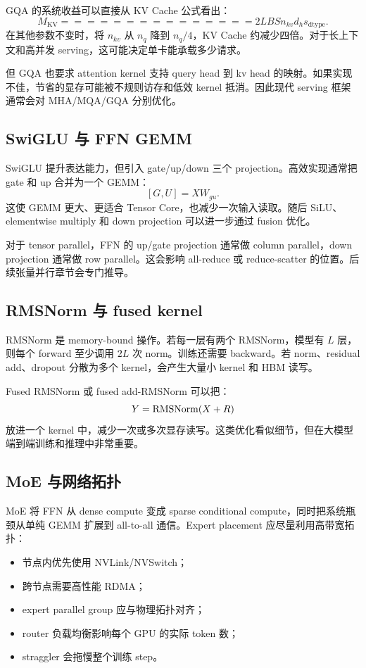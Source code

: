 GQA 的系统收益可以直接从 KV Cache 公式看出：
\[
M_{\mathrm{KV}}
===============

2LBSn_{kv}d_hs_{\mathrm{dtype}}.
\]
在其他参数不变时，将 $n_{kv}$ 从 $n_q$ 降到 $n_q/4$，KV Cache 约减少四倍。对于长上下文和高并发 serving，这可能决定单卡能承载多少请求。

但 GQA 也要求 attention kernel 支持 query head 到 kv head 的映射。如果实现不佳，节省的显存可能被不规则访存和低效 kernel 抵消。因此现代 serving 框架通常会对 MHA/MQA/GQA 分别优化。

\subsection{SwiGLU 与 FFN GEMM}
\label{subsec:swiglu-ffn-system-cost}

SwiGLU 提升表达能力，但引入 gate/up/down 三个 projection。高效实现通常把 gate 和 up 合并为一个 GEMM：
\[
[G,U]=XW_{gu}.
\]
这使 GEMM 更大、更适合 Tensor Core，也减少一次输入读取。随后 SiLU、elementwise multiply 和 down projection 可以进一步通过 fusion 优化。

对于 tensor parallel，FFN 的 up/gate projection 通常做 column parallel，down projection 通常做 row parallel。这会影响 all-reduce 或 reduce-scatter 的位置。后续张量并行章节会专门推导。

\subsection{RMSNorm 与 fused kernel}
\label{subsec:rmsnorm-fused-kernel-cost}

RMSNorm 是 memory-bound 操作。若每一层有两个 RMSNorm，模型有 $L$ 层，则每个 forward 至少调用 $2L$ 次 norm。训练还需要 backward。若 norm、residual add、dropout 分散为多个 kernel，会产生大量小 kernel 和 HBM 读写。

Fused RMSNorm 或 fused add-RMSNorm 可以把：
\[
Y=\operatorname{RMSNorm}(X+R)
\]
放进一个 kernel 中，减少一次或多次显存读写。这类优化看似细节，但在大模型端到端训练和推理中非常重要。

\subsection{MoE 与网络拓扑}
\label{subsec:moe-network-topology-cost}

MoE 将 FFN 从 dense compute 变成 sparse conditional compute，同时把系统瓶颈从单纯 GEMM 扩展到 all-to-all 通信。Expert placement 应尽量利用高带宽拓扑：

\begin{itemize}
\item 节点内优先使用 NVLink/NVSwitch；
\item 跨节点需要高性能 RDMA；
\item expert parallel group 应与物理拓扑对齐；
\item router 负载均衡影响每个 GPU 的实际 token 数；
\item straggler 会拖慢整个训练 step。
\end{itemize}

